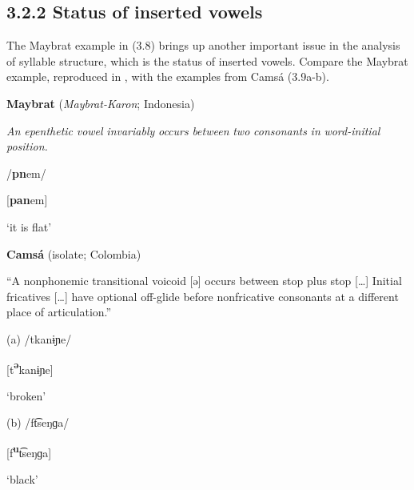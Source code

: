 \subsection{3.2.2 Status of inserted vowels}

  The Maybrat example in (3.8) brings up another important issue in the analysis of syllable structure, which is the status of inserted vowels. Compare the Maybrat example, reproduced in , with the examples from Camsá (3.9a-b).



\ea\label{ex:(3.8)}
   \textbf{Maybrat} (\textit{Maybrat-Karon}; Indonesia)



\textit{An} \textit{epenthetic} \textit{vowel} \textit{invariably} \textit{occurs} \textit{between} \textit{two} \textit{consonants} \textit{in} \textit{word-initial} \textit{position.}



/\textbf{pn}em/



[\textbf{pan}em]



‘it is flat’



\citep[35-6]{Dol2007}
\z



\ea\label{ex:(3.9)}
  \textbf{Camsá} (isolate; Colombia)



“A nonphonemic transitional voicoid [ə] occurs between stop plus stop […] Initial fricatives […] have optional off-glide before nonfricative consonants at a different place of articulation.” 



(a)   /tkanɨɲe/



  [t\textbf{\textsuperscript{ə}}kanɨɲe]



  ‘broken’



(b)   /ft͡seŋɡa/



  [f\textbf{\textsuperscript{u}}t͡seŋɡa]



  ‘black’



\citep[81]{Howard1967}

\z


